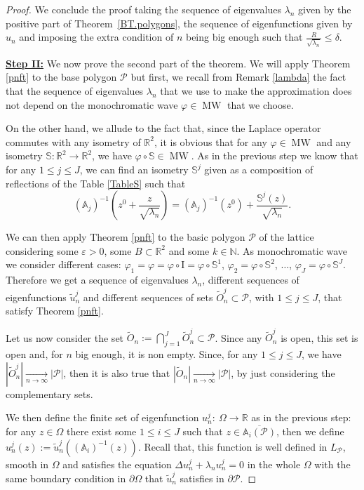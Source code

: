 \documentclass{amsart}
\theoremstyle{definition}
\theoremstyle{remark}
\newcommand{\ep}{\varepsilon}
\newcommand{\vp}{\varphi}
\def\RR{\mathbb{R}}
\renewcommand\leq\leqslant
\numberwithin{equation}{section}
\theoremstyle{definition}
\theoremstyle{remark}
\def\RR{\mathbb{R}}
\DeclareMathOperator\MW{MW}
\newcommand{\I}{{\mathrm I}}
\begin{document}
\begin{proof}
	We conclude the proof taking the sequence of eigenvalues $\lambda_n$ given by the positive part of Theorem~\ref{BT.polygons}, the sequence of eigenfunctions given by $u_{n}$ and imposing the extra condition of  $n$ being big enough such that  $\frac{R}{\sqrt{\lambda_n}}\leq \delta$.
	
\textbf{	\underline{Step II:}} 	We now prove the second part of the theorem. We will apply Theorem \ref{pnft} to the base polygon $\mathcal{P}$ but first, we recall from Remark \ref{lambda} the fact that the sequence of eigenvalues $\lambda_n$ that we use to make the approximation does not depend on the monochromatic wave $\vp\in\MW$ that we choose.

On the other hand, we allude to the fact that, since the Laplace operator commutes with any isometry of $\RR^2$, it is obvious that for any $\vp\in\MW$ and any isometry $\mathbb{S}:\mathbb{R}^2\rightarrow\mathbb{R}^2$, we have $\vp\circ\mathbb{S}\in\MW$. As in the previous step we know that for any $1\leq j\leq J$, we can find an isometry $\mathbb{S}^j$ given as a composition of reflections of the Table \ref{TableS} such that 	\begin{equation}
	\left(\mathbb{A}_j\right)^{-1}\left(z^0+\frac{z}{\sqrt{\lambda_n}}\right)=\left(\mathbb{A}_j\right)^{-1}\left(z^0\right)+\frac{\mathbb{S}^j\left(z\right)}{\sqrt{\lambda_n}}.
\end{equation}

We can then apply Theorem \ref{pnft} to the basic polygon $\mathcal{P}$ of the lattice considering some $\ep>0$, some $B\subset\RR^2$ and some $k\in\mathbb{N}$. As monochromatic wave we consider different cases: $\vp_1=\vp=\vp\circ \I=\vp\circ\mathbb{S}^1$, $\vp_2=\vp\circ\mathbb{S}^2$, $\ldots$,  $\vp_J=\vp\circ\mathbb{S}^J$. Therefore we get a sequence of eigenvalues $\lambda_n$, different sequences of eigenfunctions $\tilde{u}_{n}^j$ and different sequences of sets $\tilde{O}_n^j\subset\mathcal{P}$, with $1\leq j\leq J$, that satisfy Theorem \ref{pnft}. 
	
	Let us now consider the set $\tilde{O}_n:=\bigcap_{j=1}^J \tilde{O}_n^j\subset\mathcal{P}$. Since any $\tilde{O}_n^j$ is open, this set is open and, for $n$ big enough, it is non empty. Since, for any $1\leq j\leq J$, we have $\left|\tilde{O}_n^j\right|\xrightarrow[n\rightarrow\infty]{}\left|\mathcal{P}\right|$, then it is also true that $\left|\tilde{O}_n\right|\xrightarrow[n\rightarrow\infty]{}\left|\mathcal{P}\right|$, by just considering the complementary sets.
	
	We then define the finite set of eigenfunction $	u_{n}^j:\ \Omega\rightarrow\mathbb{R}$ as in the previous step:  for any $z\in\Omega$ there exist some $1\leq i\leq J$ such that $z\in\overline{\mathbb{A}_i\left(\mathcal{P}\right)}$, then we define $u_n^j(z):=\tilde{u}_{n}^j\left(\left(\mathbb{A}_i\right)^{-1}\left(z\right)\right).$ Recall that, this function is well defined in $L_\mathcal{P}$, smooth in $\Omega$ and satisfies the equation $\Delta u_n^j+\lambda_n u_n^j=0$ in the whole $\Omega$ with the same boundary condition in $\partial\Omega$ that $\tilde{u}_n^j$ satisfies in $\partial\mathcal{P}$.
	

\end{proof}
\end{document}
